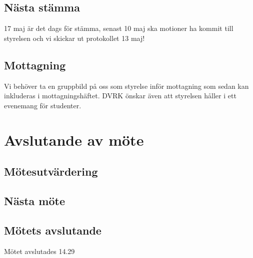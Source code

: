 \documentclass[protokoll]{dvd}
\begin{document}
    \subsection{Nästa stämma}
    17 maj är det dags för stämma, senast 10 maj ska motioner ha kommit till styrelsen och vi skickar ut protokollet 13 maj!

    \subsection{Mottagning}
    Vi behöver ta en gruppbild på oss som styrelse inför mottagning som sedan kan inkluderas i mottagningshäftet. DVRK önskar även att styrelsen håller i ett evenemang för studenter.


\section{Avslutande av möte}

\subsection{Mötesutvärdering}

\subsection{Nästa möte}

\subsection{Mötets avslutande}

Mötet avslutades 14.29

\styrelsesignaturer
\end{document}
